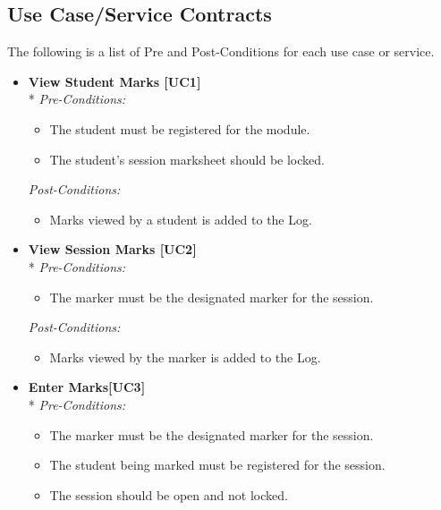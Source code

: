 \documentclass[a4paper]{article}
\begin{document}
		\subsection{Use Case/Service Contracts}
			
			The following is a list of Pre and Post-Conditions for each use case or service.
			\begin{itemize}
			
				\item 	\textbf{View Student Marks [UC1]}\\*
						\textit{Pre-Conditions:}
								\begin{itemize}
									\item The student must be registered for the module.
									\item The student's session marksheet should be locked.
								\end{itemize}
								
						\textit{Post-Conditions:}
								\begin{itemize}
									\item Marks viewed by a student is added to the Log.
								\end{itemize}
														
				\item	\textbf{View Session Marks [UC2]}\\*
						\textit{Pre-Conditions:}
								\begin{itemize}
									\item The marker must be the designated marker for the session.
								\end{itemize}
								
						\textit{Post-Conditions:}
								\begin{itemize}
									\item Marks viewed by the marker is added to the Log.
								\end{itemize}
														
				\item	\textbf{Enter Marks[UC3]}\\*
						\textit{Pre-Conditions:}
								\begin{itemize}
									\item The marker must be the designated marker for the session.
									\item The student being marked must be registered for the session.
									\item The session should be open and not locked.
								\end{itemize}
								

\end{itemize}
\end{document}
